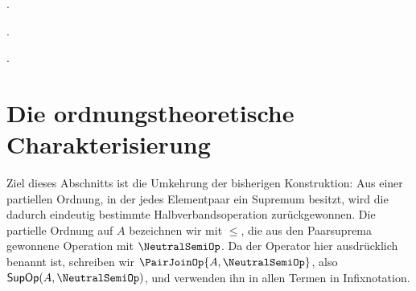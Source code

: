 \documentclass[main.tex]{subfiles}
\begin{document}
\par\noindent\begin{minipage}{\linewidth}
\par\noindent{}.\par
\end{minipage}\par


\par\noindent\begin{minipage}{\linewidth}
\par\noindent{}.\par
\end{minipage}\par


\par\noindent\begin{minipage}{\linewidth}
\par\noindent{}.\par
\end{minipage}\par


\section{Die ordnungstheoretische Charakterisierung}

Ziel dieses Abschnitts ist die Umkehrung der bisherigen Konstruktion: Aus
einer partiellen Ordnung, in der jedes Elementpaar ein Supremum besitzt, wird
die dadurch eindeutig bestimmte Halbverbandsoperation zurückgewonnen. Die
partielle Ordnung auf \(A\) bezeichnen wir mit \(\leq\), die aus den
Paarsuprema gewonnene Operation mit \(\NeutralSemiOp\). Da der Operator hier
ausdrücklich benannt ist, schreiben wir
\(\PairJoinOp{A,\NeutralSemiOp}\), also
\(\mathsf{SupOp}(A,\NeutralSemiOp)\), und verwenden ihn in allen Termen in
Infixnotation.

\par\smallskip
\end{document}
